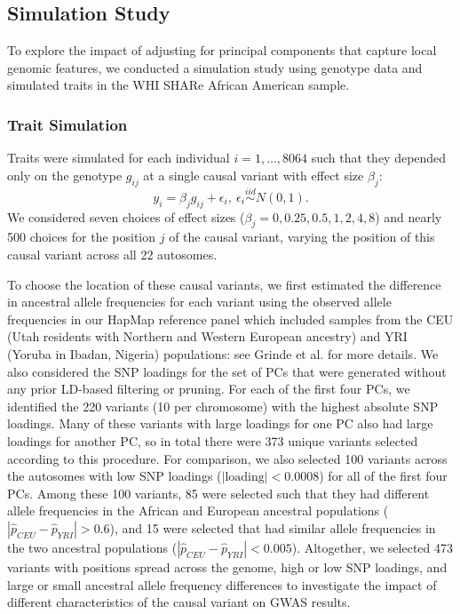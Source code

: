 \documentclass[12pt]{article}
\newcommand{\add}[1]{{\color{red}{[... #1 ...]}}}
\begin{document}
\subsection{Simulation Study}

To explore the impact of adjusting for principal components that capture local genomic features, we conducted a simulation study using genotype data and simulated traits in the WHI SHARe African American sample.

\subsubsection{Trait Simulation}

Traits were simulated for each individual $i = 1, \dots, 8064$ such that they depended only on the genotype $g_{ij}$ at a single causal variant with effect size $\beta_j$: $$y_i = \beta_j g_{ij} + \epsilon_i, \ \epsilon_i \stackrel{iid}{\sim} N(0, 1).$$
We considered seven choices of effect sizes ($\beta_j = 0, 0.25, 0.5, 1, 2, 4, 8$) and nearly 500 choices for the position $j$ of the causal variant, varying the position of this causal variant across all 22 autosomes.

To choose the location of these causal variants, we first estimated the difference in ancestral allele frequencies for each variant using the observed allele frequencies in our HapMap reference panel which included samples from the CEU (Utah residents with Northern and Western European ancestry) and YRI (Yoruba in Ibadan, Nigeria)  populations: see Grinde et al. \citep{steam} for more details.
We also considered the SNP loadings %
for the set of PCs that were generated without any prior LD-based filtering or pruning.
For each of the first four PCs, we identified the 220 variants (10 per chromosome) with the highest absolute SNP loadings. 
Many of these variants with large loadings for one PC also had large loadings for another PC, so in total there were 373 unique variants selected according to 	this procedure. 
For comparison, we also selected 100 variants across the autosomes with low SNP loadings ($|\text{loading}| < 0.0008$) for all of the first four PCs.
Among these 100 variants, 85 were selected such that they had different allele frequencies in the African and European ancestral populations ($|\hat{p}_{CEU} - \hat{p}_{YRI}| > 0.6$), and 15 were selected that had similar allele frequencies in the two ancestral populations ($|\hat{p}_{CEU} - \hat{p}_{YRI}| < 0.005$).
Altogether, we selected 473 variants with positions spread across the genome, high or low SNP loadings, and large or small ancestral allele frequency differences to investigate the impact of different characteristics of the causal variant on GWAS results.
\end{document}
